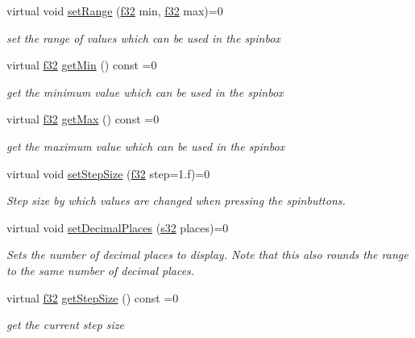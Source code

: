 \begin{DoxyCompactItemize}
virtual void \hyperlink{classirr_1_1gui_1_1IGUISpinBox_af7bc07a7be30d16a6ff27750782aaa80}{set\+Range} (\hyperlink{namespaceirr_a0277be98d67dc26ff93b1a6a1d086b07}{f32} min, \hyperlink{namespaceirr_a0277be98d67dc26ff93b1a6a1d086b07}{f32} max)=0
\begin{DoxyCompactList}\small\item\em set the range of values which can be used in the spinbox \end{DoxyCompactList}\item 
\mbox{\label{classirr_1_1gui_1_1IGUISpinBox_a22f2211e612a7cfe7847d249724cadc1}} 
virtual \hyperlink{namespaceirr_a0277be98d67dc26ff93b1a6a1d086b07}{f32} \hyperlink{classirr_1_1gui_1_1IGUISpinBox_a22f2211e612a7cfe7847d249724cadc1}{get\+Min} () const =0
\begin{DoxyCompactList}\small\item\em get the minimum value which can be used in the spinbox \end{DoxyCompactList}\item 
\mbox{\label{classirr_1_1gui_1_1IGUISpinBox_af332d184560dee8f273b50d1beca45cc}} 
virtual \hyperlink{namespaceirr_a0277be98d67dc26ff93b1a6a1d086b07}{f32} \hyperlink{classirr_1_1gui_1_1IGUISpinBox_af332d184560dee8f273b50d1beca45cc}{get\+Max} () const =0
\begin{DoxyCompactList}\small\item\em get the maximum value which can be used in the spinbox \end{DoxyCompactList}\item 
virtual void \hyperlink{classirr_1_1gui_1_1IGUISpinBox_a64296e93b52129fcf9068279baf0697d}{set\+Step\+Size} (\hyperlink{namespaceirr_a0277be98d67dc26ff93b1a6a1d086b07}{f32} step=1.f)=0
\begin{DoxyCompactList}\small\item\em Step size by which values are changed when pressing the spinbuttons. \end{DoxyCompactList}\item 
virtual void \hyperlink{classirr_1_1gui_1_1IGUISpinBox_a8a335d32cbdb7f43ca814422f8cee098}{set\+Decimal\+Places} (\hyperlink{namespaceirr_ac66849b7a6ed16e30ebede579f9b47c6}{s32} places)=0
\begin{DoxyCompactList}\small\item\em Sets the number of decimal places to display. Note that this also rounds the range to the same number of decimal places. \end{DoxyCompactList}\item 
\mbox{\label{classirr_1_1gui_1_1IGUISpinBox_a5c66183b25860667488ff6c97df241bd}} 
virtual \hyperlink{namespaceirr_a0277be98d67dc26ff93b1a6a1d086b07}{f32} \hyperlink{classirr_1_1gui_1_1IGUISpinBox_a5c66183b25860667488ff6c97df241bd}{get\+Step\+Size} () const =0
\begin{DoxyCompactList}\small\item\em get the current step size \end{DoxyCompactList}\end{DoxyCompactItemize}
